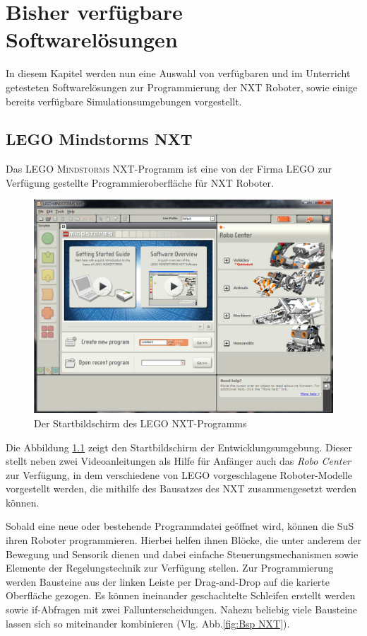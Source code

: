 \documentclass[paper=a4, DIV=calc, BCOR=12mm, twoside=on, onecolumn=on, open = right, titlepage =on, parskip =half-, headsepline = on, footsepline = off, chapterprefix = off, appendixprefix = on, fontsize = 12pt, numbers = noenddot, abstract = on]{scrbook}
\begin{document}
\chapter{Bisher verfügbare Softwarelösungen}
\label{sec:software bisher}
In diesem Kapitel werden nun eine Auswahl von verfügbaren und im Unterricht getesteten Softwarelösungen zur Programmierung der NXT Roboter, sowie einige bereits verfügbare Simulationsumgebungen vorgestellt. 


\section{LEGO Mindstorms NXT}
\label{sec:LMNXT}

Das \textsc{LEGO Mindstorms} NXT-Programm ist eine von der Firma \textsc{LEGO} zur Verfügung gestellte Programmieroberfläche für NXT Roboter.

\begin{figure}[htbp]
\centering
\includegraphics[width= \textwidth]{images/Startbildschirm_NXT.png} 
\caption[Der Startbildschirm des \textsc{LEGO} NXT-Programms]{Der Startbildschirm des \textsc{LEGO} NXT-\-Pro\-gramms}
\label{fig:NXT Start}
\end{figure}
Die Abbildung \ref{fig:NXT Start} zeigt den Startbildschirm der Entwicklungsumgebung. Dieser stellt neben zwei Videoanleitungen als Hilfe für Anfänger auch das \emph{Robo Center} zur Verfügung, in dem verschiedene von \textsc{LEGO} vorgeschlagene Roboter-Modelle vorgestellt werden, die mithilfe des Bausatzes des NXT zusammengesetzt werden können.

Sobald eine neue oder bestehende Programmdatei geöffnet wird, können die SuS ihren Roboter programmieren. Hierbei helfen ihnen Blöcke, die unter anderem der Bewegung und Sensorik dienen und dabei einfache Steuerungsmechanismen sowie Elemente der Regelungstechnik zur Verfügung stellen. Zur Programmierung werden Bausteine aus der linken Leiste per Drag-and-Drop auf die karierte Oberfläche gezogen. Es können ineinander geschachtelte Schleifen erstellt werden sowie if-Abfragen mit zwei Fallunterscheidungen. Nahezu beliebig viele Bausteine lassen sich so miteinander kombinieren (Vlg. Abb.\ref{fig:Bsp NXT}).
\end{document}
